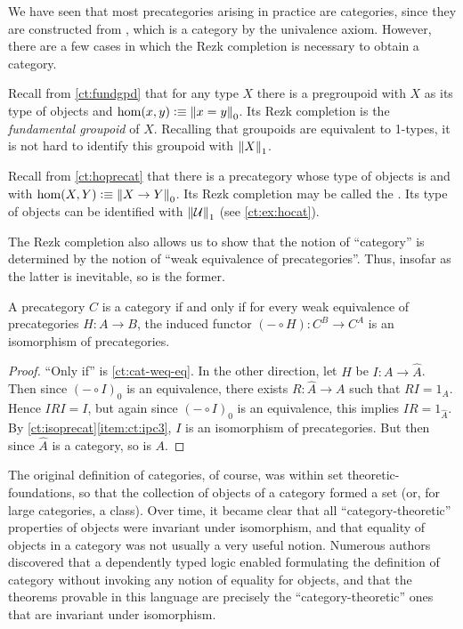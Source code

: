 We have seen that most precategories arising in practice are categories, since they are constructed from \uset, which is a category by the univalence axiom.
However, there are a few cases in which the Rezk completion is necessary to obtain a category.

\begin{eg}\label{ct:rezk-fundgpd-trunc1}
  Recall from \autoref{ct:fundgpd} that for any type $X$ there is a pregroupoid with $X$ as its type of objects and $\hom(x,y) \defeq \pizero{x=y}$.
  Its Rezk completion is the \emph{fundamental groupoid} of $X$.
  Recalling that groupoids are equivalent to 1-types, it is not hard to identify this groupoid with $\trunc1X$.
\end{eg}

\begin{eg}\label{ct:hocat}
  Recall from \autoref{ct:hoprecat} that there is a precategory whose type of objects is \type and with $\hom(X,Y) \defeq \pizero{X\to Y}$.
  Its Rezk completion may be called the .
  Its type of objects can be identified with $\trunc1\type$ (see \autoref{ct:ex:hocat}).
\end{eg}

The Rezk completion also allows us to show that the notion of ``category'' is determined by the notion of ``weak equivalence of precategories''.
Thus, insofar as the latter is inevitable, so is the former.

\begin{thm}
  A precategory $C$ is a category if and only if for every weak equivalence of precategories $H:A\to B$, the induced functor $(-\circ H):C^B \to C^A$ is an isomorphism of precategories.
\end{thm}
\begin{proof}
  ``Only if'' is \autoref{ct:cat-weq-eq}.
  In the other direction, let $H$ be $I:A\to\widehat A$.
  Then since $(-\circ I)_0$ is an equivalence, there exists $R:\widehat A\to A$ such that $RI=1_A$.
  Hence $IRI=I$, but again since $(-\circ I)_0$ is an equivalence, this implies $IR =1_{\widehat A}$.
  By \autoref{ct:isoprecat}\ref{item:ct:ipc3}, $I$ is an isomorphism of precategories.
  But then since $\widehat A$ is a category, so is $A$.
\end{proof}


\newpage

\sectionNotes

The original definition of categories, of course, was within set theoretic-foundations, so that the collection of objects of a category formed a set (or, for large categories, a class).
Over time, it became clear that all ``category-theoretic'' properties of objects were invariant under isomorphism, and that equality of objects in a category was not usually a very useful notion.
Numerous authors~\cite{blanc:eqv-log,freyd:invar-eqv,makkai:folds,makkai:comparing} discovered that a dependently typed logic enabled formulating the definition of category without invoking any notion of equality for objects, and that the theorems provable in this language are precisely the ``category-theoretic'' ones that are invariant under isomorphism.

